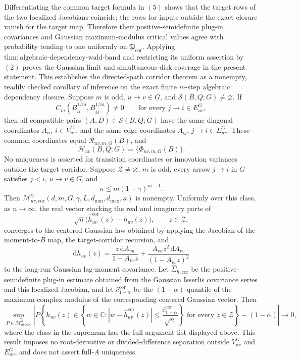 Differentiating the common target formula in \((5)\) shows that the target rows of the two localized Jacobians coincide; the rows for inputs outside the exact closure vanish for the target map.  Therefore their positive-semidefinite plug-in covariances and Gaussian maximum-modulus critical values agree with probability tending to one uniformly on \(\mathfrak P_{\mathrm{cor}}\).  Applying \(\mathrm{thm{:}algebraic\mbox{-}dependency\mbox{-}wald\mbox{-}band}\) and restricting its uniform assertion by \((2)\) proves the Gaussian limit and simultaneous-disk coverage in the present statement.  This establishes the directed-path corridor theorem as a nonempty, readily checked corollary of inference on the exact finite \(m\)-step algebraic dependency closure.
Suppose \(m\) is odd, \(u\to v\in G\), and \(\mathcal S(B,Q;G)\ne\varnothing\).  If
\[
 C_m(B_{ii}^{1/m},B_{jj}^{1/m})\ne0
 \qquad\text{for every }j\to i\in E_{uv}^{G},
\]
then all compatible pairs \((A,D)\in\mathcal S(B,Q;G)\) have the same diagonal coordinates \(A_{ii}\), \(i\in V_{uv}^{G}\), and the same edge coordinates \(A_{ij}\), \(j\to i\in E_{uv}^{G}\).  These common coordinates equal \(\mathscr R_{uv,m,G}(B)\), and
\[
 \mathcal H_{uv}(B,Q;G)=\{\Phi_{uv,m,G}(B)\}.
\]
No uniqueness is asserted for transition coordinates or innovation variances outside the target corridor.
Suppose \(\mathcal Z\ne\varnothing\), \(m\) is odd, every arrow \(j\to i\) in \(G\) satisfies \(j<i\), \(u\to v\in G\), and
\[
 \kappa\le m(1-\gamma)^{m-1}.
\]
Then \(\mathcal M_{uv,\mathrm{cor}}^{\partial}(d,m,G;\gamma,L,d_{\min},d_{\max},\kappa)\) is nonempty.  Uniformly over this class, as \(n\to\infty\), the real vector stacking the real and imaginary parts of
\[
 \sqrt n\bigl(\widehat h_{uv}^{\mathrm{cor}}(z)-h_{uv}(z)\bigr),
 \qquad z\in\mathcal Z,
\]
converges to the centered Gaussian law obtained by applying the Jacobian of the moment-to-\(B\) map, the target-corridor recursion, and
\[
 \mathrm dh_{uv}(z)
 =\frac{z\,\mathrm dA_{vu}}{1-A_{vv}z}
  +\frac{A_{vu}z^2\,\mathrm dA_{vv}}{(1-A_{vv}z)^2}
\]
to the long-run Gaussian lag-moment covariance.  Let \(\widehat\Sigma_{h,\mathrm{cor}}\) be the positive-semidefinite plug-in estimate obtained from the Gaussian Isserlis covariance series and this localized Jacobian, and let \(\widehat c_{1-\alpha}^{\mathrm{cor}}\) be the \((1-\alpha)\)-quantile of the maximum complex modulus of the corresponding centered Gaussian vector.  Then
\[
 \sup_{P\in\mathcal M_{uv,\mathrm{cor}}^{\partial}}
 \left|
 P\!\left\{
 h_{uv}(z)\in
 \left\{w\in\mathbb C:
 |w-\widehat h_{uv}^{\mathrm{cor}}(z)|
 \le\frac{\widehat c_{1-\alpha}^{\mathrm{cor}}}{\sqrt n}
 \right\}
 \text{ for every }z\in\mathcal Z
 \right\}-(1-\alpha)
 \right|\longrightarrow0,
\]
where the class in the supremum has the full argument list displayed above.  This result imposes no root-derivative or divided-difference separation outside \(V_{uv}^{G}\) and \(E_{uv}^{G}\), and does not assert full-\(A\) uniqueness.
